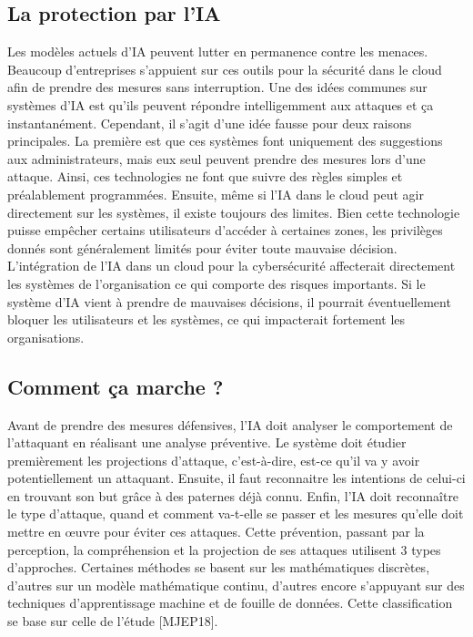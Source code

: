 \documentclass[a4paper, 12pt]{article}
\begin{document}
\begin{spacing}{1.1}
    \subsection{La protection par l'IA}
      Les modèles actuels d'IA peuvent lutter en permanence contre les
      menaces. Beaucoup d’entreprises s'appuient sur ces outils pour la sécurité
      dans le cloud afin de prendre des mesures sans interruption. Une des idées
      communes sur systèmes d'IA est qu'ils peuvent répondre intelligemment aux
      attaques et ça instantanément. Cependant, il s'agit d'une idée fausse pour
      deux raisons principales. La première est que ces systèmes font uniquement
      des suggestions aux administrateurs, mais eux seul peuvent prendre des
      mesures lors d'une attaque. Ainsi, ces technologies ne font que suivre des
      règles simples et préalablement programmées. Ensuite, même si l’IA dans le
      cloud peut agir directement sur les systèmes, il existe toujours des
      limites. Bien cette technologie puisse empêcher certains utilisateurs
      d'accéder à certaines zones, les privilèges donnés sont généralement
      limités pour éviter toute mauvaise décision. \\

      L’intégration de l’IA dans un cloud pour la cybersécurité affecterait
      directement les systèmes de l’organisation ce qui comporte des risques
      importants. Si le système d'IA vient à prendre de mauvaises décisions, il
      pourrait éventuellement bloquer les utilisateurs et les systèmes, ce qui
      impacterait fortement les organisations.

    \subsection{Comment ça marche ?}
      Avant de prendre des mesures défensives, l’IA doit analyser le
      comportement de l’attaquant en réalisant une analyse préventive. Le
      système doit étudier premièrement les projections d’attaque, c’est-à-dire,
      est-ce qu’il va y avoir potentiellement un attaquant. Ensuite, il faut
      reconnaitre les intentions de celui-ci en trouvant son but grâce à des
      paternes déjà connu. Enfin, l’IA doit reconnaître le type d’attaque, quand
      et comment va-t-elle se passer et les mesures qu’elle doit mettre en œuvre
      pour éviter ces attaques. Cette prévention, passant par la perception, la
      compréhension et la projection de ses attaques utilisent 3 types
      d’approches. Certaines méthodes se basent sur les mathématiques discrètes,
      d'autres sur un modèle mathématique continu, d'autres encore s'appuyant
      sur des techniques d'apprentissage machine et de fouille de données. Cette
      classification se base sur celle de l'étude [MJEP18]. \\



\end{spacing}
\end{document}
